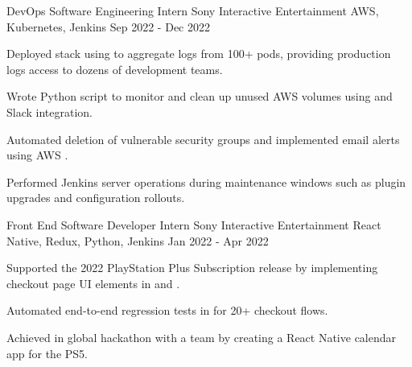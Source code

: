 

\begin{cventries}

  \cventry
    {DevOps Software Engineering Intern} %
    {Sony Interactive Entertainment} %
    {AWS, Kubernetes, Jenkins} %
    {Sep 2022 - Dec 2022} %
    {
      \begin{cvitems} %
        \item {Deployed  stack using  to aggregate logs from 100+  pods, providing production logs access to dozens of development teams.}
        \item {Wrote Python script to monitor and clean up unused AWS volumes using  and Slack integration.}
        \item {Automated deletion of vulnerable security groups and implemented email alerts using AWS .}
        \item {Performed  Jenkins server operations during maintenance windows such as plugin upgrades and configuration rollouts.}
      \end{cvitems}
    }

  \cventry
    {Front End Software Developer Intern} %
    {Sony Interactive Entertainment} %
    {React Native, Redux, Python, Jenkins} %
    {Jan 2022 - Apr 2022} %
    {
      \begin{cvitems} %
        \item {Supported the 2022 PlayStation Plus Subscription release by implementing checkout page UI elements in  and .}
        \item {Automated end-to-end regression tests in  for 20+ checkout flows.} 
        \item {Achieved  in global hackathon with a team by creating a React Native calendar app for the PS5.}
      \end{cvitems}
    }


\end{cventries}
